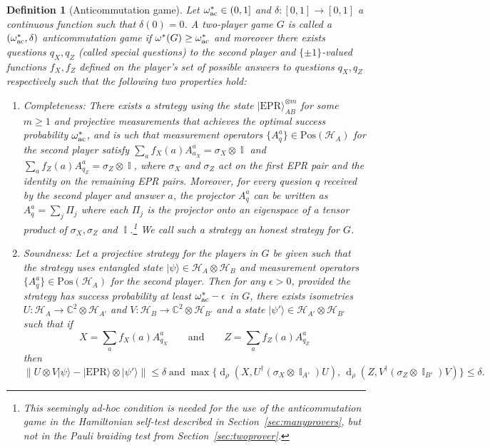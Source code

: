 \documentclass[11pt,letterpaper]{article}
\newcommand{\<}{\langle}
\renewcommand{\>}{\rangle}
\newtheorem{definition}[theorem]{Definition}
\newcommand{\setft}[1]{\mathrm{#1}}
\newcommand{\ket}[1]{| #1 \>}
\newcommand{\eps}{\epsilon}
\newcommand{\ot}{\otimes}
\newcommand{\mH}{\mathcal{H}}
\DeclareMathOperator{\Id}{\mathbb{I}}
\DeclareMathOperator{\DIS}{d}
\newcommand{\wg}{\omega^*_{\ensuremath{\rm ac}}}
\newcommand{\C}{\mathbb{C}}
\newcommand{\EPR}{\mathrm{EPR}}
\newcommand{\Pos}{\setft{Pos}}
\begin{document}
\begin{definition}[Anticommutation game]\label{def:ac-game}
Let $\wg\in (0,1]$ and $\delta:[0,1]\to [0,1]$ a continuous function such that $\delta(0)=0$. 
A two-player game $G$ is called a $(\wg,\delta)$ anticommutation game if
$\omega^*(G)\geq \wg$ and moreover there exists questions $q_X,q_Z$ (called
\emph{special questions}) to the second player and $\{\pm1\}$-valued functions $f_X,f_Z$ defined on the player's set of possible answers to questions $q_X,q_Z$ respectively such that the following two properties hold:
\begin{enumerate}
\item {\em Completeness:} There exists a strategy using the state
$\ket{\EPR}_{AB}^{\ot m}$ for some $m \geq 1$ and projective measurements that achieves the optimal success probability $\wg$, and is uch that measurement operators $\{A_q^a\}
\in \Pos(\mH_A)$ for the second player satisfy $\sum_a f_X(a) A_{a_X}^a = \sigma_X \ot \Id$ and $\sum_a f_Z(a) A_{q_Z}^a
= \sigma_Z \ot \Id$, where $\sigma_X$ and $\sigma_Z$ act on
the first EPR pair and the identity on the remaining EPR pairs. Moreover,
for every quesion $q$ received by the second player and answer $a$, the projector $A_q^a$ can be written as
$A_q^a = \sum_j \Pi_j$ where each $\Pi_j$ is the projector onto an eigenspace of
a tensor product of $\sigma_X, \sigma_Z$ and $\Id$.\footnote{This seemingly ad-hoc condition is needed for the use of the anticommutation game in the Hamiltonian self-test described in Section~\ref{sec:manyprovers}, but not in the Pauli braiding test from Section~\ref{sec:twoprover}.} We call such a strategy an
\emph{honest strategy} for $G$.
\item
Soundness: Let a projective strategy for the players in $G$ be given such that the strategy uses entangled state $\ket{\psi}\in\mH_A \otimes \mH_B$ and measurement operators $\{A_q^a\} \in\Pos(\mH_A)$ for the second player. Then for any $\eps>0$, provided the strategy has success probability at least $\wg-\eps$ in $G$, there exists 
 isometries $U:\mH_A \to \C^2\otimes \mH_{A'}$ and $V:\mH_B \to \C^2 \otimes \mH_{B'}$ and a state $\ket{\psi'}\in\mH_{A'}\otimes \mH_{B'}$ such that if 
\begin{equation}\label{eq:def-ac-xz}
X = \sum_a f_X(a) A_{q_X}^a\qquad \text{and}\qquad Z = \sum_a {f_Z(a)} A_{q_Z}^a
\end{equation}
then 
$$ \big\| U\otimes V \ket{\psi} - \ket{\EPR}\otimes \ket{\psi'} \big\|\leq \delta\; \text{and}\;
\max\Big\{ \DIS_{\rho}(X,U^\dagger (\sigma_X\otimes \Id_{A'}) U),\,
\DIS_{\rho}(Z,V^\dagger (\sigma_Z\otimes \Id_{B'}) V)\Big\}\leq \delta.$$
\end{enumerate}
\end{definition}
\end{document}
